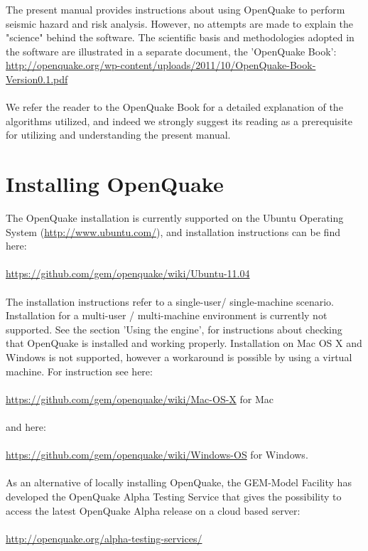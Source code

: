 The present manual provides instructions about using OpenQuake to perform seismic hazard and risk analysis. However, no attempts are made to explain the "science" behind the software. The scientific basis and methodologies adopted in the software are illustrated in a separate document, the 'OpenQuake Book':\\
\href{http://openquake.org/wp-content/uploads/2011/10/OpenQuake-Book_Version0.1.pdf}
   {http://openquake.org/wp-content/uploads/2011/10/OpenQuake-Book-Version0.1.pdf}\\ \\
We refer the reader to the OpenQuake Book for a detailed explanation of the algorithms utilized, and indeed we strongly suggest its reading as a prerequisite for utilizing and understanding the present manual.

\section{Installing OpenQuake}
The OpenQuake installation is currently supported on the Ubuntu Operating System (\href{http://www.ubuntu.com/}
   {http://www.ubuntu.com/}), and installation instructions can be find here:\\ \\
    \href{https://github.com/gem/openquake/wiki/Ubuntu-11.04}
   {https://github.com/gem/openquake/wiki/Ubuntu-11.04}\\ \\
The installation instructions refer to a single-user/ single-machine scenario. Installation for a multi-user / multi-machine 
environment is currently not supported. See the section 'Using the engine', for instructions about checking that OpenQuake is installed and working properly.
Installation on Mac OS X and Windows is not supported, however a workaround is possible by using a virtual machine. For instruction see here:\\ \\
\href{https://github.com/gem/openquake/wiki/Mac-OS-X}
   {https://github.com/gem/openquake/wiki/Mac-OS-X}   for Mac\\ \\
   and here:\\ \\
   \href{https://github.com/gem/openquake/wiki/Windows-OS}
   {https://github.com/gem/openquake/wiki/Windows-OS} for Windows.\\ \\
As an alternative of locally installing OpenQuake, the GEM-Model Facility has developed the OpenQuake Alpha Testing Service that gives the possibility to access the latest OpenQuake Alpha release on a cloud based server:\\ \\
\href{http://openquake.org/alpha-testing-services/}
   {http://openquake.org/alpha-testing-services/}
   
